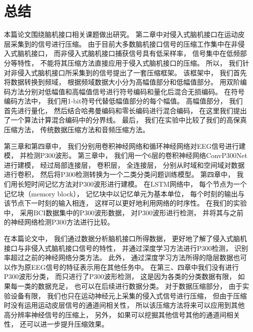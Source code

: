 \chapter{总结}

本篇论文围绕脑机接口相关课题做出研究。 第二章中对侵入式脑机接口在运动皮层采集到的信号进行压缩。 由于目前大多数脑机接口信号的压缩工作集中在非侵入式脑机接口， 而非侵入式脑机接口捕获信号具有低采样率， 信号集中在低频部分等特性， 不能将其压缩方法直接应用于侵入式脑机接口的压缩。 所以， 我们针对非侵入式脑机接口所采集到的信号提出了一套压缩框架。 该框架中， 我们首先将数据转换到频域， 根据频域数据大小分为高幅值部分和低幅值部分。 用双阶编码方法分别对低幅值和高幅值信号进行符号编码和量化后混合无损编码。 在符号编码方法中， 我们用1-bit符号代替低幅值部分的每个幅值。 高幅值部分， 我们首先进行量化， 然后结合哈弗曼编码和零长编码进行混合编码， 在这里我们提出了一个算法计算混合编码中的分界线。 最后， 我们在实验中比较了我们的高保真压缩方法， 传统数据压缩方法和音频压缩方法。 

第三章和第四章中， 我们分别用卷积神经网络和循环神经网络对EEG信号进行建模， 并检测P300波形。 第三章中， 我们用一个6层的卷积神经网络ConvP300Net进行建模， 经过局部连接层， 卷积层， 全连接层， 分别从时域和空间域对数据进行卷积， 然后将P300检测转换为一个二类分类问题训练模型。 第四章中， 我们用长短时间记忆方法对P300波形进行建模。 在LSTM网络中， 每个节点为一个记忆块（memory block）， 记忆块中以记忆单元为基本单位， 每个时刻的输出与该节点下一时刻的输入相连， 这样可以更好地利用网络的时序性。 在我们的实验中， 采用BCI数据集中的P300波形数据， 对P300波形进行检测， 并将其与之前的神经网络检测P300方法进行比较。 

在本篇论文中， 我们通过数据分析脑机接口所得数据， 更好地了解了侵入式脑机接口与非侵入式脑机接口信号的特性， 并通过深度学习方法进行P300检测， 识别率超过之前的神经网络分类方法。 此外， 通过深度学习方法所得的隐层数据也可以作为原EEG信号的特征表示用在其他任务中。 在第三、四章中我们没有进行P300波形分类， 而只进行了P300波形检测， 这是因为各类的分类数据有限， 如果每一类的数据充足， 也可以在后续进行数据分类。 对于数据压缩部分， 由于实验设备有限， 我们也只在运动神经元上采集的侵入式信号进行压缩， 但由于压缩时没有运用运动皮层信号的通道间相关性， 所以该压缩方法将来可以应用到其他高分辨率神经信号的压缩上， 另外， 如果可以挖掘其他信号其他的通道间相关性， 还可以进一步提升压缩效果。


